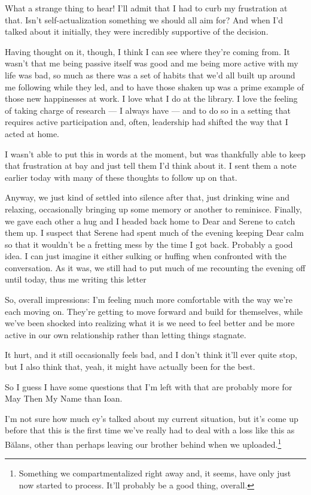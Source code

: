 What a strange thing to hear! I'll admit that I had to curb my frustration at that. Isn't self-actualization something we should all aim for? And when I'd talked about it initially, they were incredibly supportive of the decision.

Having thought on it, though, I think I can see where they're coming from. It wasn't that me being passive itself was good and me being more active with my life was bad, so much as there was a set of habits that we'd all built up around me following while they led, and to have those shaken up was a prime example of those new happinesses at work. I love what I do at the library. I love the feeling of taking charge of research — I always have — and to do so in a setting that requires active participation and, often, leadership had shifted the way that I acted at home.

I wasn't able to put this in words at the moment, but was thankfully able to keep that frustration at bay and just tell them I'd think about it. I sent them a note earlier today with many of these thoughts to follow up on that.

Anyway, we just kind of settled into silence after that, just drinking wine and relaxing, occasionally bringing up some memory or another to reminisce. Finally, we gave each other a hug and I headed back home to Dear and Serene to catch them up. I suspect that Serene had spent much of the evening keeping Dear calm so that it wouldn't be a fretting mess by the time I got back. Probably a good idea. I can just imagine it either sulking or huffing when confronted with the conversation. As it was, we still had to put much of me recounting the evening off until today, thus me writing this letter

So, overall impressions: I'm feeling much more comfortable with the way we're each moving on. They're getting to move forward and build for themselves, while we've been shocked into realizing what it is we need to feel better and be more active in our own relationship rather than letting things stagnate.

It hurt, and it still occasionally feels bad, and I don't think it'll ever quite stop, but I also think that, yeah, it might have actually been for the best.

So I guess I have some questions that I'm left with that are probably more for May Then My Name than Ioan.

I'm not sure how much ey's talked about my current situation, but it's come up before that this is the first time we've really had to deal with a loss like this as Bălans, other than perhaps leaving our brother behind when we uploaded.\footnote{Something we compartmentalized right away and, it seems, have only just now started to process. It'll probably be a good thing, overall.}

